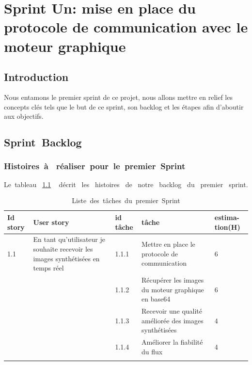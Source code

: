 \graphicspath{{./chapitres/chapitre3/figures/}}
\setcounter{mtc}{3}
\chapter{Sprint Un:  mise en place du protocole de communication avec le moteur graphique }
\minitoc
\newpage
\section*{Introduction}
Nous entamons le premier sprint de ce projet, nous allons mettre en relief les concepts clés tels que le but de ce sprint, son backlog et les étapes afin d’aboutir aux objectifs.


\section{Sprint\textcolor{white}{J}Backlog}
\subsection{Histoires\textcolor{white}{J}à\textcolor{white}{J} réaliser\textcolor{white}{J}pour\textcolor{white}{J}le\textcolor{white}{J}premier\textcolor{white}{J}Sprint}
Le\textcolor{white}{J}tableau\textcolor{white}{J} \ref{tab:tab-s1} \textcolor{white}{J} décrit\textcolor{white}{J} les\textcolor{white}{J} histoires\textcolor{white}{J} de\textcolor{white}{J} notre\textcolor{white}{J} backlog\textcolor{white}{J} du\textcolor{white}{J} premier\textcolor{white}{J} sprint.
\begin{longtable}[!ht]{|m{1cm}|m{3cm}|m{1cm}|m{7cm}|m{1.3cm}|}
\hline
{\textbf{Id story}} & {\textbf{User story}} & {\textbf{id tâche}} & {\textbf{tâche}} & {\textbf{estima-tion(H)}}\\
\hline
1.1 & En tant qu’utilisateur je souhaite recevoir les images synthétisées en temps  réel & 1.1.1 & Mettre en place le protocole de communication  & 6\\
\cline{3-5}
&   & 1.1.2 & Récupérer les images du moteur graphique en base64 & 6\\
\cline{3-5}
&   & 1.1.3 & Recevoir une qualité améliorée des images synthétisées & 4\\
\cline{3-5}
&	& 1.1.4 & Améliorer la fiabilité du flux & 4\\
\hline
\caption{Liste\textcolor{white}{J}des\textcolor{white}{J}tâches\textcolor{white}{J}du\textcolor{white}{J}premier\textcolor{white}{J}Sprint}
\label{tab:tab-s1}
\end{longtable}

